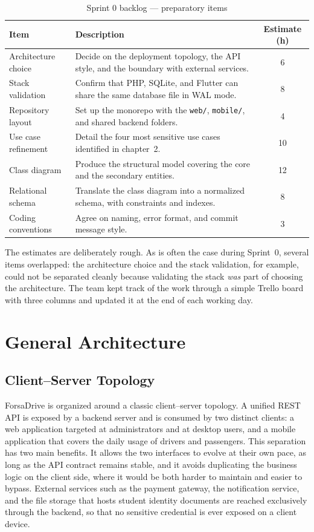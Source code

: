 \begin{table}[H]
\centering
\caption{Sprint 0 backlog — preparatory items}
\label{tab:sprint0_backlog}
\begin{tabular}{|p{3.5cm}|p{9cm}|c|}
\hline
\textbf{Item} & \textbf{Description} & \textbf{Estimate (h)} \\
\hline
Architecture choice & Decide on the deployment topology, the API style, and the boundary with external services. & 6 \\
\hline
Stack validation & Confirm that PHP, SQLite, and Flutter can share the same database file in WAL mode. & 8 \\
\hline
Repository layout & Set up the monorepo with the \texttt{web/}, \texttt{mobile/}, and shared backend folders. & 4 \\
\hline
Use case refinement & Detail the four most sensitive use cases identified in chapter~2. & 10 \\
\hline
Class diagram & Produce the structural model covering the core and the secondary entities. & 12 \\
\hline
Relational schema & Translate the class diagram into a normalized schema, with constraints and indexes. & 8 \\
\hline
Coding conventions & Agree on naming, error format, and commit message style. & 3 \\
\hline
\end{tabular}
\end{table}

The estimates are deliberately rough. As is often the case during Sprint~0, several items overlapped: the architecture choice and the stack validation, for example, could not be separated cleanly because validating the stack \textit{was} part of choosing the architecture. The team kept track of the work through a simple Trello board with three columns and updated it at the end of each working day.

\section{General Architecture}

\subsection{Client--Server Topology}

ForsaDrive is organized around a classic client--server topology. A unified REST API is exposed by a backend server and is consumed by two distinct clients: a web application targeted at administrators and at desktop users, and a mobile application that covers the daily usage of drivers and passengers. This separation has two main benefits. It allows the two interfaces to evolve at their own pace, as long as the API contract remains stable, and it avoids duplicating the business logic on the client side, where it would be both harder to maintain and easier to bypass. External services such as the payment gateway, the notification service, and the file storage that hosts student identity documents are reached exclusively through the backend, so that no sensitive credential is ever exposed on a client device.

